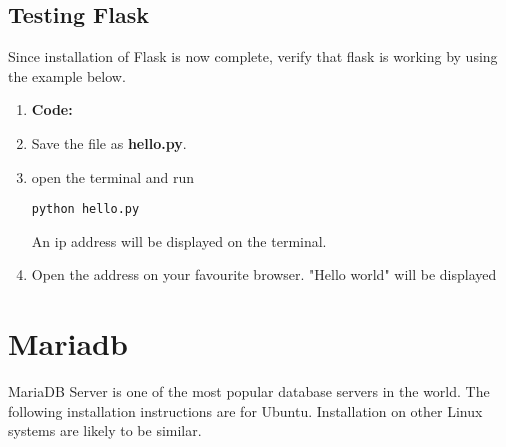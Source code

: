 \documentclass[journal,12pt,twocolumn]{IEEEtran}
\begin{document}
\subsection{Testing Flask}
Since installation of Flask is now complete, verify that flask is working by using the example below. 
\begin{enumerate}
 
\item \textbf{Code:}

\begin{description}
\item 
\end{description}

\item Save the file as \textbf{hello.py}.

\item open the terminal and run 
\begin{lstlisting}
python hello.py
\end{lstlisting}
An ip address will be displayed on the terminal.

\item Open the address on your favourite browser. "Hello world" will be displayed
\end{enumerate}






%
\section{Mariadb }
MariaDB Server is one of the most popular database servers in the world. The following installation instructions are for Ubuntu.  Installation on other Linux systems are likely to be similar.
\end{document}
